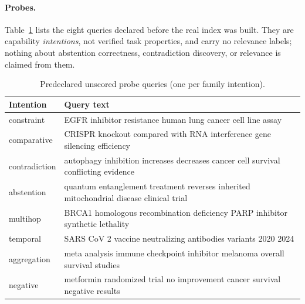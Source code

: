 \paragraph{Probes.}
Table~\ref{tab:probes} lists the eight queries declared before the real index was built. They are capability \emph{intentions}, not verified task properties, and carry no relevance labels; nothing about abstention correctness, contradiction discovery, or relevance is claimed from them.

\begin{table}[h]
\centering
\small
\caption{Predeclared unscored probe queries (one per family intention).}
\label{tab:probes}
\begin{tabular}{@{}l>{\raggedright\arraybackslash}p{9.6cm}@{}}
\toprule
Intention & Query text \\
\midrule
constraint & EGFR inhibitor resistance human lung cancer cell line assay \\
comparative & CRISPR knockout compared with RNA interference gene silencing efficiency \\
contradiction & autophagy inhibition increases decreases cancer cell survival conflicting evidence \\
abstention & quantum entanglement treatment reverses inherited mitochondrial disease clinical trial \\
multihop & BRCA1 homologous recombination deficiency PARP inhibitor synthetic lethality \\
temporal & SARS CoV 2 vaccine neutralizing antibodies variants 2020 2024 \\
aggregation & meta analysis immune checkpoint inhibitor melanoma overall survival studies \\
negative & metformin randomized trial no improvement cancer survival negative results \\
\bottomrule
\end{tabular}
\end{table}

